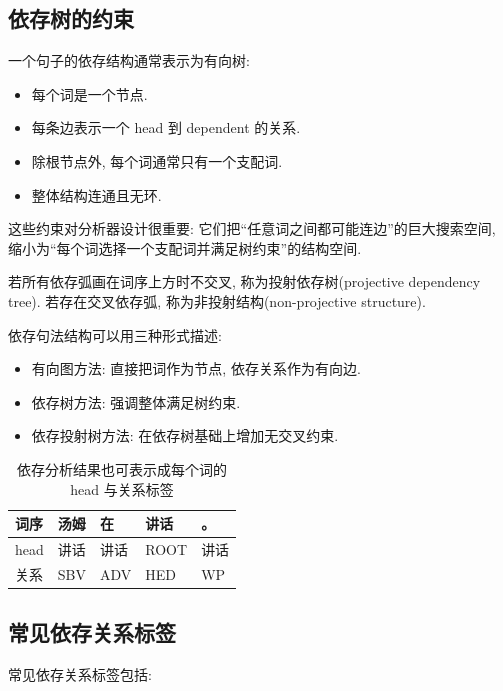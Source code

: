 \subsection{依存树的约束}


一个句子的依存结构通常表示为有向树:

\begin{itemize}
\item 每个词是一个节点.
\item 每条边表示一个 head 到 dependent 的关系.
\item 除根节点外, 每个词通常只有一个支配词.
\item 整体结构连通且无环.
\end{itemize}

这些约束对分析器设计很重要:
它们把“任意词之间都可能连边”的巨大搜索空间,
缩小为“每个词选择一个支配词并满足树约束”的结构空间.

若所有依存弧画在词序上方时不交叉, 称为投射依存树(projective dependency tree).
若存在交叉依存弧, 称为非投射结构(non-projective structure).

依存句法结构可以用三种形式描述:

\begin{itemize}
\item 有向图方法: 直接把词作为节点, 依存关系作为有向边.
\item 依存树方法: 强调整体满足树约束.
\item 依存投射树方法: 在依存树基础上增加无交叉约束.
\end{itemize}

\begin{table}[H]
\centering
\begingroup
\setlength{\tabcolsep}{2pt}
\small
\caption{依存分析结果也可表示成每个词的 head 与关系标签}
\begin{tabular}{|p{}|p{}|p{}|p{}|p{}|}
\hline
词序 & 汤姆 & 在 & 讲话 & 。 \\ \hline
head & 讲话 & 讲话 & ROOT & 讲话 \\ \hline
关系 & SBV & ADV & HED & WP \\ \hline
\end{tabular}
\endgroup
\end{table}

\subsection{常见依存关系标签}


常见依存关系标签包括:

